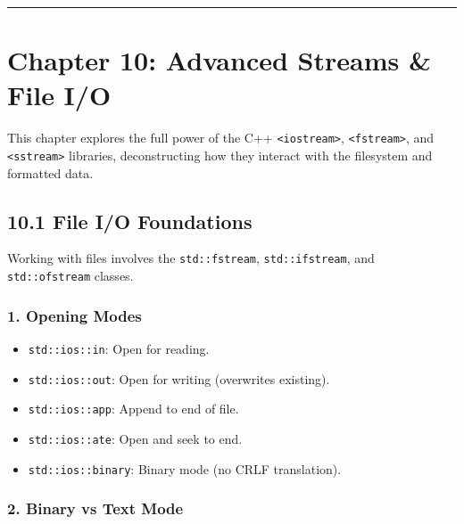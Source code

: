 \begin{center}\rule{0.5\linewidth}{0.5pt}\end{center}

\hypertarget{chapter-10-advanced-streams-file-io}{%
\section{Chapter 10: Advanced Streams \& File
I/O}\label{chapter-10-advanced-streams-file-io}}

This chapter explores the full power of the C++
\passthrough{\lstinline!<iostream>!},
\passthrough{\lstinline!<fstream>!}, and
\passthrough{\lstinline!<sstream>!} libraries, deconstructing how they
interact with the filesystem and formatted data.

\hypertarget{file-io-foundations}{%
\subsection{10.1 File I/O Foundations}\label{file-io-foundations}}

Working with files involves the \passthrough{\lstinline!std::fstream!},
\passthrough{\lstinline!std::ifstream!}, and
\passthrough{\lstinline!std::ofstream!} classes.

\hypertarget{opening-modes}{%
\subsubsection{1. Opening Modes}\label{opening-modes}}

\begin{itemize}
\tightlist
\item
  \passthrough{\lstinline!std::ios::in!}: Open for reading.
\item
  \passthrough{\lstinline!std::ios::out!}: Open for writing (overwrites
  existing).
\item
  \passthrough{\lstinline!std::ios::app!}: Append to end of file.
\item
  \passthrough{\lstinline!std::ios::ate!}: Open and seek to end.
\item
  \passthrough{\lstinline!std::ios::binary!}: Binary mode (no CRLF
  translation).
\end{itemize}

\hypertarget{binary-vs-text-mode}{%
\subsubsection{2. Binary vs Text Mode}\label{binary-vs-text-mode}}

